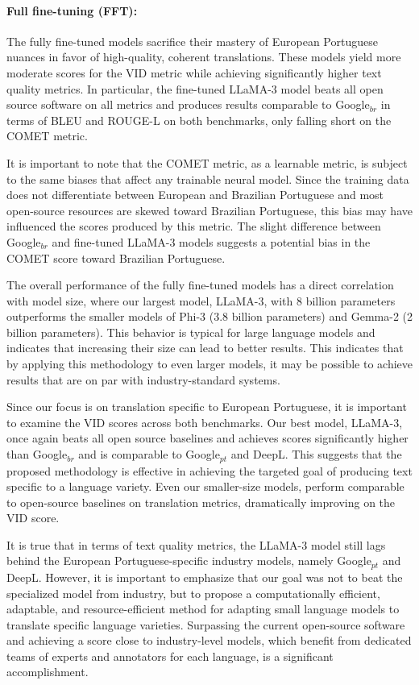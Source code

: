 \paragraph{Full fine-tuning (FFT):}
The fully fine-tuned models sacrifice their mastery of European Portuguese nuances in favor of high-quality, coherent translations. 
These models yield more moderate scores for the VID metric while achieving significantly higher text quality metrics. 
In particular, the fine-tuned LLaMA-3 model beats all open source software on all metrics and produces results comparable to Google$_{br}$ in terms of BLEU and ROUGE-L on both benchmarks, only falling short on the COMET metric. 

It is important to note that the COMET metric, as a learnable metric, is subject to the same biases that affect any trainable neural model. Since the training data does not differentiate between European and Brazilian Portuguese and most open-source resources are skewed toward Brazilian Portuguese, this bias may have influenced the scores produced by this metric.
The slight difference between Google$_{br}$ and fine-tuned LLaMA-3 models suggests a potential bias in the COMET score toward Brazilian Portuguese.

The overall performance of the fully fine-tuned models has a direct correlation with model size, where our largest model, LLaMA-3, with 8 billion parameters outperforms the smaller models of Phi-3 (3.8 billion parameters) and Gemma-2 (2 billion parameters). 
This behavior is typical for large language models and indicates that increasing their size can lead to better results. This indicates that by applying this methodology to even larger models, it may be possible to achieve results that are on par with industry-standard systems. %


Since our focus is on translation specific to European Portuguese, it is important to examine the VID scores across both benchmarks.
Our best model, LLaMA-3, once again beats all open source baselines and achieves scores significantly higher than Google$_{br}$ and is comparable to Google$_{pt}$ and DeepL. This suggests that the proposed methodology is effective in achieving the targeted goal of producing text specific to a language variety. 
Even our smaller-size models, perform comparable to open-source baselines on translation metrics, dramatically improving on the VID score. 

It is true that in terms of text quality metrics, the LLaMA-3 model still lags behind the European Portuguese-specific industry models, namely Google$_{pt}$ and DeepL. However, it is important to emphasize that our goal was not to beat the specialized model from industry, but to propose a computationally efficient, adaptable, and resource-efficient method for adapting small language models to translate specific language varieties. Surpassing the current open-source software and achieving a score close to industry-level models, which benefit from dedicated teams of experts and annotators for each language, is a significant accomplishment.
